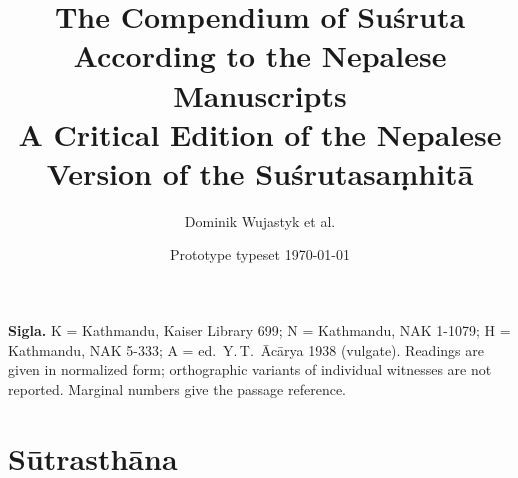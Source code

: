 \documentclass[10pt,twoside]{book}
\title{\normalfont The Compendium of Suśruta\\[4pt]
  \large According to the Nepalese Manuscripts\\[10pt]
  \normalsize A Critical Edition of the Nepalese Version of the Suśrutasaṃhitā\\[20pt]
  \Large\skt{सुश्रुतसंहिता}}
\author{\normalfont Dominik Wujastyk et al.}
\date{\normalfont Prototype typeset \today}
\begin{document}
\maketitle
{\rmfamily\small\noindent\textbf{Sigla.} K = Kathmandu, Kaiser Library 699;
N = Kathmandu, NAK 1-1079; H = Kathmandu, NAK 5-333;
A = ed.\ Y.\,T.~Ācārya 1938 (vulgate).
Readings are given in normalized form; orthographic variants of individual
witnesses are not reported.  Marginal numbers give the passage reference.\par}
\bigskip

\chapter*{\rmfamily Sūtrasthāna}

\end{document}
